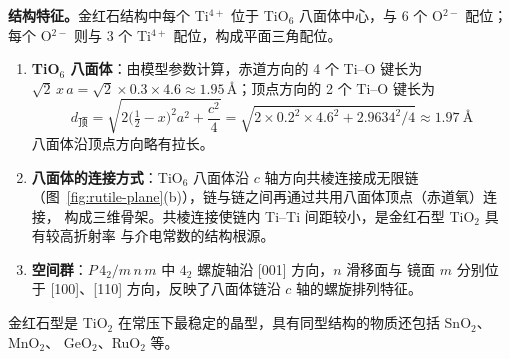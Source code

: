 \textbf{结构特征。}金红石结构中每个 Ti$^{4+}$ 位于 TiO$_6$ 八面体中心，与 6 个
O$^{2-}$ 配位；每个 O$^{2-}$ 则与 3 个 Ti$^{4+}$ 配位，构成平面三角配位。

\begin{enumerate}[label=（\arabic*）]
  \item \textbf{TiO$_6$ 八面体}：由模型参数计算，赤道方向的 4 个 Ti--O 键长为
    $\sqrt{2}\,x\,a=\sqrt{2}\times0.3\times4.6\approx1.95$\,\AA；顶点方向的 2 个
    Ti--O 键长为
    \begin{equation}
      d_{\text{顶}}=\sqrt{2\bigl(\tfrac12-x\bigr)^2a^2+\frac{c^2}{4}}
        =\sqrt{2\times0.2^2\times4.6^2+2.9634^2/4}\approx1.97\ \text{\AA}
    \end{equation}
    八面体沿顶点方向略有拉长。
  \item \textbf{八面体的连接方式}：TiO$_6$ 八面体沿 $c$ 轴方向共棱连接成无限链
    （图~\ref{fig:rutile-plane}(b)），链与链之间再通过共用八面体顶点（赤道氧）连接，
    构成三维骨架。共棱连接使链内 Ti--Ti 间距较小，是金红石型 TiO$_2$ 具有较高折射率
    与介电常数的结构根源。
  \item \textbf{空间群}：$P\,4_2/m\,n\,m$ 中 $4_2$ 螺旋轴沿 [001] 方向，$n$ 滑移面与
    镜面 $m$ 分别位于 [100]、[110] 方向，反映了八面体链沿 $c$ 轴的螺旋排列特征。
\end{enumerate}

金红石型是 TiO$_2$ 在常压下最稳定的晶型，具有同型结构的物质还包括 SnO$_2$、MnO$_2$、
GeO$_2$、RuO$_2$ 等。

